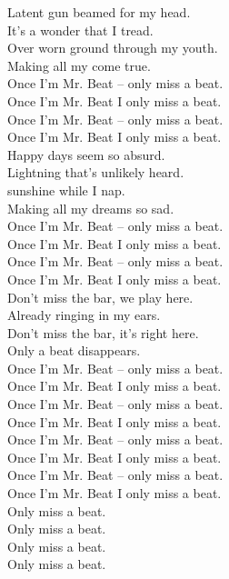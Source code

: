 Latent gun beamed for my head. \\
It's a wonder that I tread. \\
Over worn ground through my youth. \\
Making all my  come true. \\

Once I'm Mr. Beat -- only miss a beat. \\
Once I'm Mr. Beat I only miss a beat. \\
Once I'm Mr. Beat -- only miss a beat. \\
Once I'm Mr. Beat I only miss a beat. \\

Happy days seem so absurd. \\
Lightning that's unlikely heard. \\
 sunshine while I nap. \\
Making all my dreams so sad. \\

Once I'm Mr. Beat -- only miss a beat. \\
Once I'm Mr. Beat I only miss a beat. \\
Once I'm Mr. Beat -- only miss a beat. \\
Once I'm Mr. Beat I only miss a beat. \\

Don't miss the bar, we play here. \\
Already ringing in my ears. \\
Don't miss the bar, it's right here. \\
Only a beat disappears. \\

Once I'm Mr. Beat -- only miss a beat. \\
Once I'm Mr. Beat I only miss a beat. \\
Once I'm Mr. Beat -- only miss a beat. \\
Once I'm Mr. Beat I only miss a beat. \\
Once I'm Mr. Beat -- only miss a beat. \\
Once I'm Mr. Beat I only miss a beat. \\
Once I'm Mr. Beat -- only miss a beat. \\
Once I'm Mr. Beat I only miss a beat. \\

Only miss a beat. \\
Only miss a beat. \\
Only miss a beat. \\
Only miss a beat. \\

